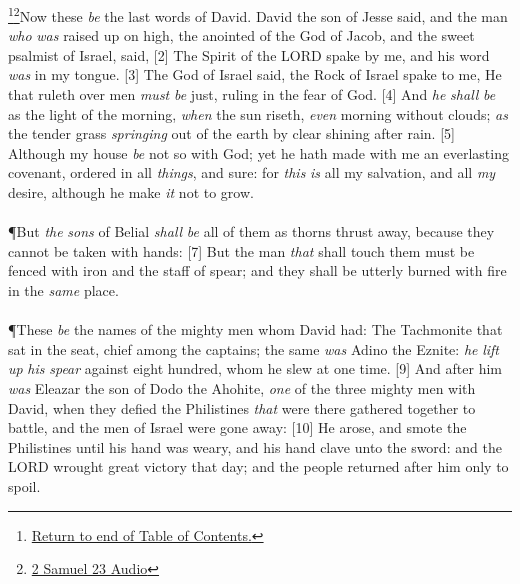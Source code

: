 \footnote{\textcolor[cmyk]{0.99998,1,0,0}{\hyperlink{TOC}{Return to end of Table of Contents.}}}\footnote{\href{https://audiobible.com/bible/2_samuel_23.html}{\textcolor[cmyk]{0.99998,1,0,0}{2 Samuel 23 Audio}}}\textcolor[cmyk]{0.99998,1,0,0}{Now these \emph{be} the last words of David. David the son of Jesse said, and the man \emph{who} \emph{was} raised up on high, the anointed of the God of Jacob, and the sweet psalmist of Israel, said,}
[2] \textcolor[cmyk]{0.99998,1,0,0}{The Spirit of the LORD spake by me, and his word \emph{was} in my tongue.}
[3] \textcolor[cmyk]{0.99998,1,0,0}{The God of Israel said, the Rock of Israel spake to me, He that ruleth over men \emph{must} \emph{be} just, ruling in the fear of God.}
[4] \textcolor[cmyk]{0.99998,1,0,0}{And \emph{he} \emph{shall} \emph{be} as the light of the morning, \emph{when} the sun riseth, \emph{even} morning without clouds; \emph{as} the tender grass \emph{springing} out of the earth by clear shining after rain.}
[5] \textcolor[cmyk]{0.99998,1,0,0}{Although my house \emph{be} not so with God; yet he hath made with me an everlasting covenant, ordered in all \emph{things}, and sure: for \emph{this} \emph{is} all my salvation, and all \emph{my} desire, although he make \emph{it} not to grow.}\\
\\
\P \textcolor[cmyk]{0.99998,1,0,0}{But \emph{the} \emph{sons} of Belial \emph{shall} \emph{be} all of them as thorns thrust away, because they cannot be taken with hands:}
[7] \textcolor[cmyk]{0.99998,1,0,0}{But the man \emph{that} shall touch them must be fenced with iron and the staff of spear; and they shall be utterly burned with fire in the \emph{same} place.}\\
\\
\P \textcolor[cmyk]{0.99998,1,0,0}{These \emph{be} the names of the mighty men whom David had: The Tachmonite that sat in the seat, chief among the captains; the same \emph{was} Adino the Eznite: \emph{he} \emph{lift} \emph{up} \emph{his} \emph{spear} against eight hundred, whom he slew at one time.}
[9] \textcolor[cmyk]{0.99998,1,0,0}{And after him \emph{was} Eleazar the son of Dodo the Ahohite, \emph{one} of the three mighty men with David, when they defied the Philistines \emph{that} were there gathered together to battle, and the men of Israel were gone away:}
[10] \textcolor[cmyk]{0.99998,1,0,0}{He arose, and smote the Philistines until his hand was weary, and his hand clave unto the sword: and the LORD wrought great victory that day; and the people returned after him only to spoil.}
